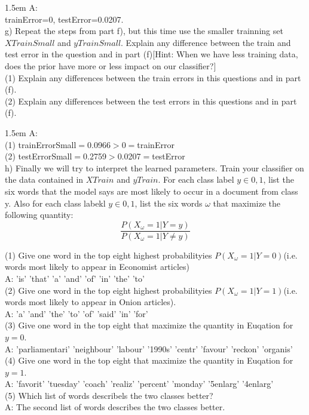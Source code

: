 \documentclass[a4paper]{article}
\begin{document}
\hangindent 1.5em
\noindent
A:\\
trainError=0, testError=0.0207.\\

\noindent
g) Repeat the steps from part f), but this time use the smaller trainning set $XTrainSmall$ and $yTrainSmall$. Explain any difference between the train and test error in the question and in part (f)[Hint: When we have less training data, does the prior have more or less impact on our classifier?]\\
(1) Explain any differences between the train errors in this questions and in part (f).\\
(2) Explain any differences between the test errors in this questions and in part (f).

\hangindent 1.5em
\noindent
A:\\
(1) trainErrorSmall$=$0.0966$>$0$=$trainError\\
(2) testErrorSmall$=$0.2759$>$0.0207$=$testError\\

\noindent
h) Finally we will try to interpret the learned parameters. Train your classifier on the data contained in $XTrain$ and $yTrain$. For each class label $y\in {0,1}$, list the six words that the model says are most likely to occur in a document from class y. Also for each class labekl $y\in{0,1}$, list the six words $\omega$ that maximize the following quantity:
\[\frac{P(X_{\omega}=1|Y=y)}{P(X_{\omega}=1|Y\neq y)}
\]

\noindent
(1) Give one word in the top eight highest probabilityies $P(X_{\omega}=1|Y=0)$(i.e. words most likely to appear in Economist articles)\\
\noindent
A: 'is'    'that'    'a'      'and'    'of'    'in'      'the'    'to' \\

\noindent
(2) Give one word in the top eight highest probabilityies $P(X_{\omega}=1|Y=1)$(i.e. words most likely to appear in Onion articles).\\
\noindent
A: 
     'a'     'and'     'the'    'to'     'of'    'said'    'in'     'for'\\
     

\noindent
(3) Give one word in the top eight that maximize the quantity in Euqation for $y=0$.\\
\noindent
A:   'parliamentari'    'neighbour'    'labour'    '1990s'     'centr'      'favour'    'reckon'     'organis'\\

\noindent
(4) Give one word in the top eight that maximize the quantity in Euqation for $y=1$.\\
\noindent
A:   'favorit'          'tuesday'      'coach'     'realiz'    'percent'    'monday'    '5enlarg'    '4enlarg'\\

\noindent
(5) Which list of words describels the two classes better?\\
\noindent
A: The second list of words describes the two classes better.
\end{document}
